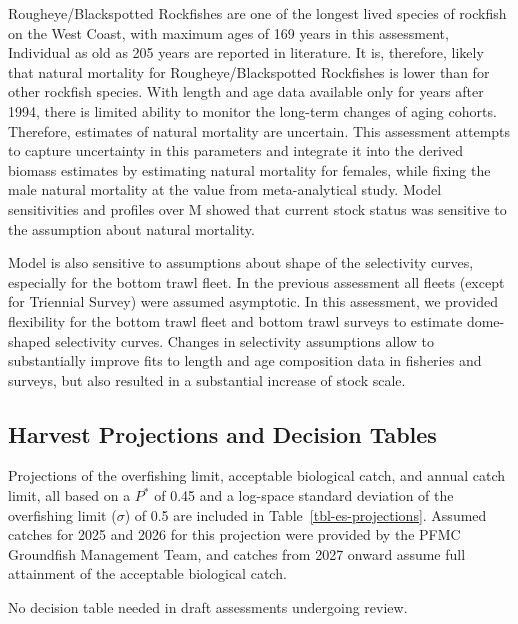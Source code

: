 \documentclass[
]{scrartcl}
\begin{document}
Rougheye/Blackspotted Rockfishes are one of the longest lived species of
rockfish on the West Coast, with maximum ages of 169 years in this
assessment, Individual as old as 205 years are reported in literature.
It is, therefore, likely that natural mortality for
Rougheye/Blackspotted Rockfishes is lower than for other rockfish
species. With length and age data available only for years after 1994,
there is limited ability to monitor the long-term changes of aging
cohorts. Therefore, estimates of natural mortality are uncertain. This
assessment attempts to capture uncertainty in this parameters and
integrate it into the derived biomass estimates by estimating natural
mortality for females, while fixing the male natural mortality at the
value from meta-analytical study. Model sensitivities and profiles over
M showed that current stock status was sensitive to the assumption about
natural mortality.

Model is also sensitive to assumptions about shape of the selectivity
curves, especially for the bottom trawl fleet. In the previous
assessment all fleets (except for Triennial Survey) were assumed
asymptotic. In this assessment, we provided flexibility for the bottom
trawl fleet and bottom trawl surveys to estimate dome-shaped selectivity
curves. Changes in selectivity assumptions allow to substantially
improve fits to length and age composition data in fisheries and
surveys, but also resulted in a substantial increase of stock scale.

\subsection{Harvest Projections and Decision
Tables}\label{harvest-projections-and-decision-tables}

Projections of the overfishing limit, acceptable biological catch, and
annual catch limit, all based on a \(P^*\) of 0.45 and a log-space
standard deviation of the overfishing limit (\(\sigma\)) of 0.5 are
included in Table~\ref{tbl-es-projections}. Assumed catches for 2025 and
2026 for this projection were provided by the PFMC Groundfish Management
Team, and catches from 2027 onward assume full attainment of the
acceptable biological catch.

No decision table needed in draft assessments undergoing review.
\end{document}
